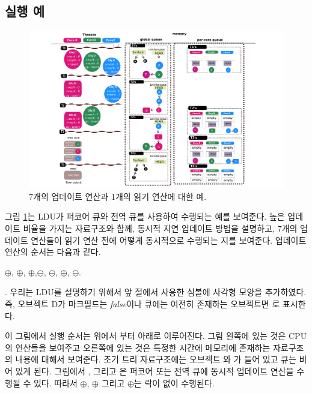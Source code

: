 \subsection{실행 예}
\begin{figure}[h!]
  \begin{center}
     \includegraphics[width=1.0\textwidth,height=0.4\textheight]{fig/basic_gldu}
  \end{center}
  \caption{7개의 업데이트 연산과 1개의 읽기 연산에 대한 예.}
  \label{fig:basic}
\end{figure}


그림 \ref{fig:basic}는 LDU가 퍼코어 큐와 전역 큐를 사용하여 수행되는 예를 보여준다.
높은 업데이트 비율을 가지는 자료구조와 함께, 동시적 지연 업데이트 방법을 설명하고, 
7개의 업데이트 연산들이 읽기 연산 전에 어떻게 동시적으로
수행되는 지를 보여준다.
업데이트 연산의 순서는 다음과 같다. 
\begin{center}
$\oplus$, $\oplus$, $\oplus$,$\ominus$,
$\ominus$, $\oplus$, $\ominus$. 
\end{center}.
우리는 LDU를 설명하기 위해서 앞 절에서 사용한 심볼에 사각형 모양을 추가하였다. 
즉, 오브젝트 D가 마크필드는 \textit{false}이나 큐에는 여전히 존재하는 오브젝트면 로 표시한다.

이 그림에서 실행 순서는 위에서 부터 아래로 이루어진다.
그림 왼쪽에 있는 것은 CPU의 연산들을 보여주고 오른쪽에 있는 것은 특정한 시간에 메모리에 존재하는 
자료구조의 내용에 대해서 보여준다. 
초기 트리 자료구조에는 오브젝트 와 가 들어 있고 큐는 비어 있게 된다.
그림에서 ,  그리고 은 
퍼코어 또는 전역 큐에 동시적 업데이트 연산을 수행될 수 있다.
따라서 $\oplus$, $\oplus$ 그리고 $\oplus$는 락이 없이 수행된다.

